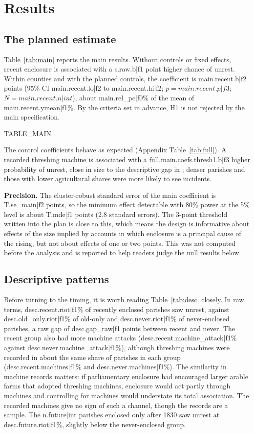 \documentclass[11pt,a4paper]{article}
\begin{document}
\section{Results}
\subsection{The planned estimate}
Table~\ref{tab:main} reports the main results. Without controls or fixed effects, recent enclosure is associated with a {{s.raw.b|f1}} point higher chance of unrest. Within counties and with the planned controls, the coefficient is {{main.recent.b|f2}} points (95\% CI {{main.recent.lo|f2}} to {{main.recent.hi|f2}}; $p={{main.recent.p|f3}}$; $N={{main.recent.n|int}}$), about {{main.rel_pc|f0}}\% of the mean of {{main.recent.ymean|f1}}\%. By the criteria set in advance, H1 is not rejected by the main specification.

{{TABLE_MAIN}}

The control coefficients behave as expected (Appendix Table~\ref{tab:full}). A recorded threshing machine is associated with a {{full.main.coefs.thresh1.b|f3}} higher probability of unrest, close in size to the descriptive gap in \citet{caprettinivoth2020}; denser parishes and those with lower agricultural shares were more likely to see incidents.

\textbf{Precision.} The cluster-robust standard error of the main coefficient is {{T.se_main|f2}} points, so the minimum effect detectable with 80\% power at the 5\% level is about {{T.mde|f1}} points (2.8 standard errors). The 3-point threshold written into the plan is close to this, which means the design is informative about effects of the size implied by accounts in which enclosure is a principal cause of the rising, but not about effects of one or two points. This was not computed before the analysis and is reported to help readers judge the null results below.

\subsection{Descriptive patterns}
Before turning to the timing, it is worth reading Table~\ref{tab:desc} closely. In raw terms, {{desc.recent.riot|f1}}\% of recently enclosed parishes saw unrest, against {{desc.old_only.riot|f1}}\% of old-only and {{desc.never.riot|f1}}\% of never-enclosed parishes, a raw gap of {{desc.gap_raw|f1}} points between recent and never. The recent group also had more machine attacks ({{desc.recent.machine_attack|f1}}\% against {{desc.never.machine_attack|f1}}\%), although threshing machines were recorded in about the same share of parishes in each group ({{desc.recent.machines|f1}}\% and {{desc.never.machines|f1}}\%). The similarity in machine records matters: if parliamentary enclosure had encouraged larger arable farms that adopted threshing machines, enclosure would act partly through machines and controlling for machines would understate its total association. The recorded machines give no sign of such a channel, though the records are a sample. The {{n.future|int}} parishes enclosed only after 1830 saw unrest at {{desc.future.riot|f1}}\%, slightly below the never-enclosed group.
\end{document}
